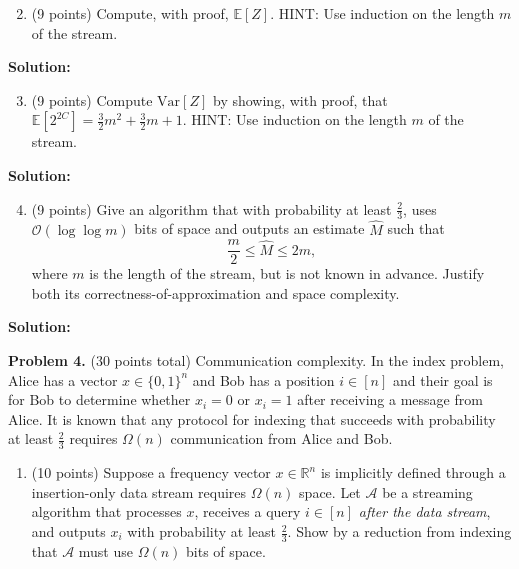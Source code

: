 \documentclass[11pt]{article}
\newcommand{\Ex}[1]{\ensuremath{\mathbb{E}\left[#1\right]}}
\newcommand{\Var}[1]{\ensuremath{\text{Var}\left[#1\right]}}
\begin{document}
\begin{enumerate}
\setcounter{enumi}{1}
\item (9 points)
Compute, with proof, $\Ex{Z}$. 
\vskip 0.1in\noindent
HINT: Use induction on the length $m$ of the stream. 
\end{enumerate}

\noindent\textbf{Solution:}





\begin{enumerate}
\setcounter{enumi}{2}
\item (9 points)
Compute $\Var{Z}$ by showing, with proof, that $\Ex{2^{2C}}=\frac{3}{2}m^2+\frac{3}{2}m+1$. 
\vskip 0.1in\noindent
HINT: Use induction on the length $m$ of the stream. 
\end{enumerate}

\noindent\textbf{Solution:}





\begin{enumerate}
\setcounter{enumi}{3}
\item (9 points)
Give an algorithm that with probability at least $\frac{2}{3}$, uses $\mathcal{O}(\log\log m)$ bits of space and outputs an estimate $\widehat{M}$ such that
\[\frac{m}{2}\le\widehat{M}\le 2m,\]
where $m$ is the length of the stream, but is not known in advance. 
Justify both its correctness-of-approximation and space complexity. 
\end{enumerate}

\noindent\textbf{Solution:}




\newpage\noindent
\textbf{Problem 4.} (30 points total)
Communication complexity.
\vskip 0.1in\noindent
In the index problem, Alice has a vector $x\in\{0,1\}^n$ and Bob has a position $i\in[n]$ and their goal is for Bob to determine whether $x_i=0$ or $x_i=1$ after receiving a message from Alice. 
It is known that any protocol for indexing that succeeds with probability at least $\frac{2}{3}$ requires $\Omega(n)$ communication from Alice and Bob.
\begin{enumerate}
\item (10 points)
Suppose a frequency vector $x\in\mathbb{R}^n$ is implicitly defined through a insertion-only data stream requires $\Omega(n)$ space. 
Let $\mathcal{A}$ be a streaming algorithm that processes $x$, receives a query $i\in[n]$ \emph{after the data stream}, and outputs $x_i$ with probability at least $\frac{2}{3}$. 
Show by a reduction from indexing that $\mathcal{A}$ must use $\Omega(n)$ bits of space. 
\end{enumerate}
\end{document}

